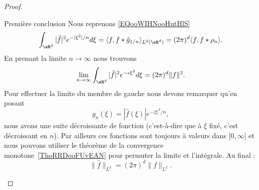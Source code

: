 \begin{proof}
\begin{subproof}
    \item[Première conclusion]
        Nous reprenons \eqref{EQooWIHNooHutHlS}
        \begin{equation}
            \int_{\eR^d}| \hat f |^2 e^{-| \xi^2 |/n}d\xi=\langle f, f*\hat g_{1/n}\rangle_{L^2(\eR^d)}=(2\pi)^d\langle f, f* \rho_n \rangle .
        \end{equation}
        En prenant la limite \( n\to \infty\) nous trouvons
        \begin{equation}
            \lim_{n\to \infty}\int_{\eR^d}| \hat f |^2 e^{-\epsilon\xi^2}d\xi=(2\pi)^d\| f \|^2.
        \end{equation}
        Pour effectuer la limite du membre de gauche nous devons remarquer qu'en posant
        \begin{equation}
            g_n(\xi)=| \hat f(\xi) | e^{-| \xi |^2/n},
        \end{equation}
        nous avons une suite décroissante de fonction (c'est-à-dire que à \( \xi\) fixé, c'est décroissant en \(n\)). Par ailleurs ces fonctions sont toujours à valeurs dans \( \mathopen[ 0 , \infty \mathclose]\) et nous pouvons utiliser le théorème de la convergence monotone~\ref{ThoRRDooFUvEAN} pour permuter la limite et l'intégrale. Au final :
        \begin{equation}
            \| \hat f \|_{L^2}=(2\pi)^d\| f \|_{L^2}.
        \end{equation}
    \end{subproof}


\end{proof}
